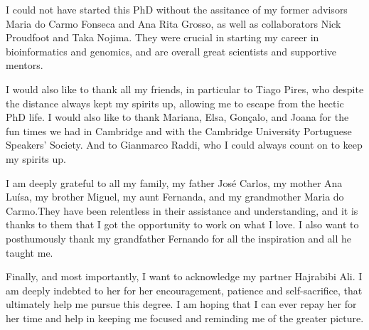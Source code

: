 \begin{acknowledgements}
I could not have started this PhD without the assitance of my former advisors Maria do Carmo Fonseca and Ana Rita Grosso, as well as collaborators Nick Proudfoot and Taka Nojima. They were crucial in starting my career in bioinformatics and genomics, and are overall great scientists and supportive mentors.

I would also like to thank all my friends, in particular to Tiago Pires, who despite the distance always kept my spirits up, allowing me to escape from the hectic PhD life. I would also like to thank Mariana, Elsa, Gonçalo, and Joana for the fun times we had in Cambridge and with the Cambridge University Portuguese Speakers' Society. And to Gianmarco Raddi, who I could always count on to keep my spirits up.

I am deeply grateful to all my family, my father José Carlos, my mother Ana Luísa, my brother Miguel, my aunt Fernanda, and my grandmother Maria do Carmo.They have been relentless in their assistance and understanding, and it is thanks to them that I got the opportunity to work on what I love. I also want to posthumously thank my grandfather Fernando for all the inspiration and all he taught me.

Finally, and most importantly, I want to acknowledge my partner Hajrabibi Ali. I am deeply indebted to her for her encouragement, patience and self-sacrifice, that ultimately help me pursue this degree. I am hoping that I can ever repay her for her time and help in keeping me focused and reminding me of the greater picture.

\end{acknowledgements}
